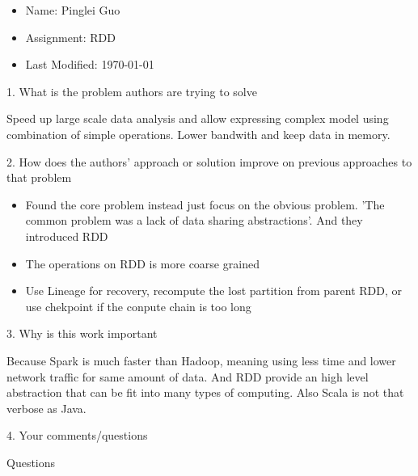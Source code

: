 \documentclass[12pt,a4paper,oneside]{article}
\begin{document}
\begin{itemize}
  \item Name: Pinglei Guo
  \item Assignment: RDD
  \item Last Modified: \today
\end{itemize}

1. What is the problem authors are trying to solve

\medskip

Speed up large scale data analysis and allow expressing complex model using combination
of simple operations. Lower bandwith and keep data in memory.

\bigskip

2. How does the authors’ approach or solution improve on previous approaches to that problem

\medskip

\begin{itemize}
  \item Found the core problem instead just focus on the obvious problem. 'The common problem was a lack of data sharing abstractions'. And
  they introduced RDD
  \item The operations on RDD is more coarse grained
  \item Use Lineage for recovery, recompute the lost partition from parent RDD, or use chekpoint if the conpute chain is too long
\end{itemize}

\bigskip

3. Why is this work important

\medskip

Because Spark is much faster than Hadoop, meaning using less time and lower network traffic for same amount of data.
And RDD provide an high level abstraction that can be fit into many types of computing. Also Scala is not that verbose
as Java.

\bigskip

4. Your comments/questions

\medskip

Questions
\end{document}
